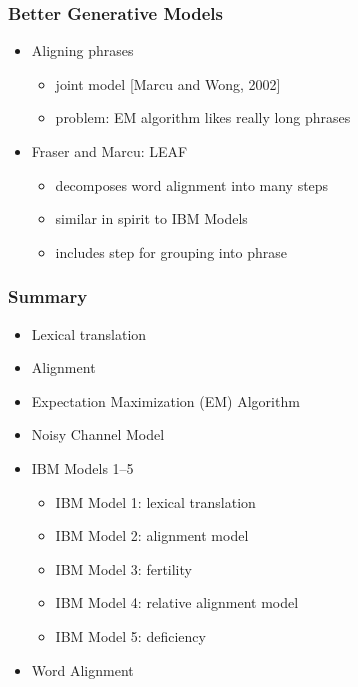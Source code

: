  
\begin{frame}
\frametitle{Better Generative Models\koehnref}

\begin{itemize}
\item Aligning phrases
\begin{itemize}
\item joint model [Marcu and Wong, 2002]
\item problem: EM algorithm likes really long phrases
\end{itemize}
\vspace{10mm}
\item Fraser and Marcu: LEAF
\begin{itemize}
\item decomposes word alignment into many steps
\item similar in spirit to IBM Models
\item includes step for grouping into phrase
\end{itemize}
\end{itemize}

\end{frame}


\begin{frame}
\frametitle{Summary\koehnref}
\begin{itemize}
\item Lexical translation
\item Alignment
\item Expectation Maximization (EM) Algorithm
\item Noisy Channel Model
\item IBM Models 1--5
\begin{itemize}
\item IBM Model 1: lexical translation
\item IBM Model 2: alignment model
\item IBM Model 3: fertility
\item IBM Model 4: relative alignment model
\item IBM Model 5: deficiency
\end{itemize}
\item Word Alignment
\end{itemize}

\end{frame}




